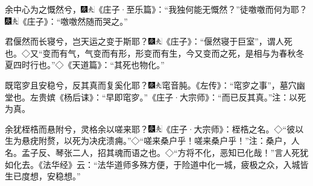 余中心为之慨然兮，{\includegraphics[width=3mm]{../Images/00004}\includegraphics[width=3mm]{../Images/00012}\footnotesize \kaishu 《庄子·至乐篇》：``我独何能无慨然？''}徒噭噭而何为耶？{{\includegraphics[width=3mm]{../Images/00004}\includegraphics[width=3mm]{../Images/00012}\footnotesize \kaishu 《庄子》：``}噭噭{然随而哭之。''}}

君偃然而长寝兮，岂天运之变于斯耶？{\includegraphics[width=3mm]{../Images/00004}\includegraphics[width=3mm]{../Images/00012}\footnotesize \kaishu 《庄子》：``偃然寝于巨室''，谓人死也。◇又``变而有气，气变而有形，形变而有生，今又变而之死，是相与为春秋冬夏四时行也。''◇《天道篇》：``其死也物化。''}

既窀穸且安稳兮，反其真而复奚化耶？{\includegraphics[width=3mm]{../Images/00004}\includegraphics[width=3mm]{../Images/00012}\footnotesize \kaishu 窀音肫。《左传》：``窀穸之事''，墓穴幽堂也。左贵嫔《杨后诔》：``早即窀穸。''《庄子·大宗师》：``而已反其真。''注：以死为真。}

余犹桎梏而悬附兮，灵格余以嗟来耶？{\includegraphics[width=3mm]{../Images/00004}\includegraphics[width=3mm]{../Images/00012}\footnotesize \kaishu 《庄子·大宗师》：桎梏之名。◇``彼以生为悬疣附赘，以死为决疣溃痈。''◇``嗟来桑户乎！嗟来桑户乎！''注：桑户，人名。孟子反、琴张二人，招其魂而语之也。◇``方将不化，恶知已化哉！''言人死犹如化去。《法华经》云：``法华道师多殊方便，于险道中化一城，疲极之众，入城皆生已度想，安稳想。''}

